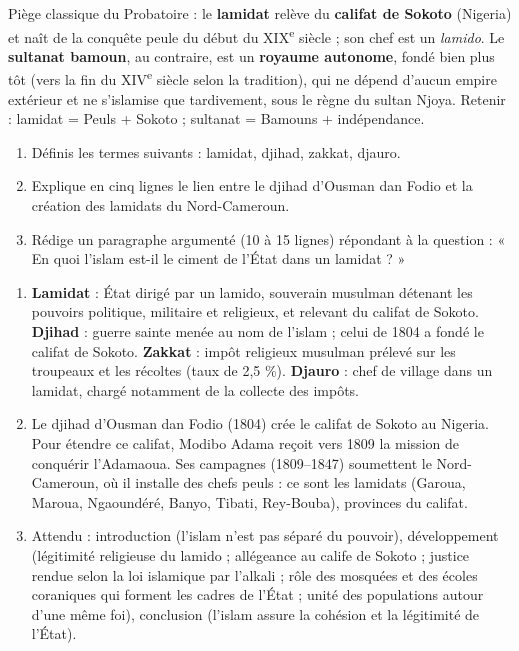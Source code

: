 \documentclass[11pt]{article}
\begin{document}
\begin{attention}
Piège classique du Probatoire : le \textbf{lamidat} relève du \textbf{califat de Sokoto} (Nigeria) et naît de la conquête peule du début du XIX\textsuperscript{e} siècle ; son chef est un \emph{lamido}. Le \textbf{sultanat bamoun}, au contraire, est un \textbf{royaume autonome}, fondé bien plus tôt (vers la fin du XIV\textsuperscript{e} siècle selon la tradition), qui ne dépend d'aucun empire extérieur et ne s'islamise que tardivement, sous le règne du sultan Njoya. Retenir : lamidat = Peuls + Sokoto ; sultanat = Bamouns + indépendance.
\end{attention}

\begin{exercice}
\begin{enumerate}
\item Définis les termes suivants : lamidat, djihad, zakkat, djauro.
\item Explique en cinq lignes le lien entre le djihad d'Ousman dan Fodio et la création des lamidats du Nord-Cameroun.
\item Rédige un paragraphe argumenté (10 à 15 lignes) répondant à la question : « En quoi l'islam est-il le ciment de l'État dans un lamidat ? »
\end{enumerate}
\end{exercice}

\begin{corrige}[Exercice]
\begin{enumerate}
\item \textbf{Lamidat} : État dirigé par un lamido, souverain musulman détenant les pouvoirs politique, militaire et religieux, et relevant du califat de Sokoto. \textbf{Djihad} : guerre sainte menée au nom de l'islam ; celui de 1804 a fondé le califat de Sokoto. \textbf{Zakkat} : impôt religieux musulman prélevé sur les troupeaux et les récoltes (taux de 2,5 \%). \textbf{Djauro} : chef de village dans un lamidat, chargé notamment de la collecte des impôts.
\item Le djihad d'Ousman dan Fodio (1804) crée le califat de Sokoto au Nigeria. Pour étendre ce califat, Modibo Adama reçoit vers 1809 la mission de conquérir l'Adamaoua. Ses campagnes (1809--1847) soumettent le Nord-Cameroun, où il installe des chefs peuls : ce sont les lamidats (Garoua, Maroua, Ngaoundéré, Banyo, Tibati, Rey-Bouba), provinces du califat.
\item Attendu : introduction (l'islam n'est pas séparé du pouvoir), développement (légitimité religieuse du lamido ; allégeance au calife de Sokoto ; justice rendue selon la loi islamique par l'alkali ; rôle des mosquées et des écoles coraniques qui forment les cadres de l'État ; unité des populations autour d'une même foi), conclusion (l'islam assure la cohésion et la légitimité de l'État).
\end{enumerate}
\end{corrige}
\end{document}
